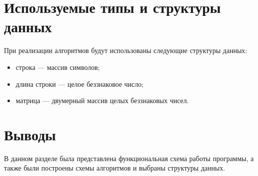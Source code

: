 \clearpage

\section{Используемые типы и структуры данных}

При реализации алгоритмов будут использованы следующие структуры данных:

\begin{itemize}
	\item строка --- массив символов;
	\item длина строки --- целое беззнаковое число;
	\item матрица --- двумерный массив целых беззнаковых чисел.
\end{itemize}

\section{Выводы}

В данном разделе была представлена функциональная схема работы программы, а также были построены схемы алгоритмов и выбраны структуры данных.

